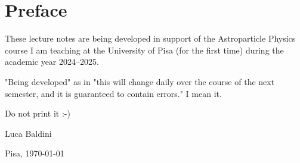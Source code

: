 \chapter*{Preface}

These lecture notes are being developed in support of the Astroparticle Physics
course I am teaching at the University of Pisa (for the first time) during the
academic year 2024--2025.

"Being developed" as in "this will change daily over the course of the next
semester, and it is guaranteed to contain errors." I mean it.

Do not print it :-)

\bigskip

Luca Baldini

\smallskip

Pisa, \today